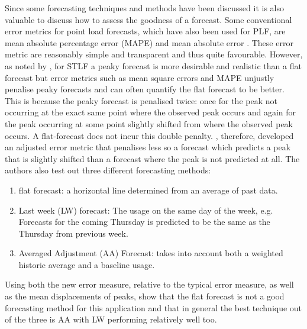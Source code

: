 \documentclass[a4paper]{article}
\begin{document}
Since some forecasting techniques and methods have been discussed it is also valuable to discuss how to assess the goodness of a forecast. Some conventional error metrics for point load forecasts, which have also been used for PLF, are mean absolute percentage error (MAPE) and mean absolute error \citep{hong16}. These error metric are reasonably simple and transparent and thus quite favourable. However, as noted by \cite{dan14}, for STLF a peaky forecast is more desirable and realistic than a flat forecast but error metrics such as mean square errors and MAPE unjustly penalise peaky forecasts and can often quantify the flat forecast to be better. This is because the peaky forecast is penalised twice: once for the peak not occurring at the exact same point where the observed peak occurs and again for the peak occurring at some point slightly shifted from where the observed peak occurs. A flat-forecast does not incur this double penalty. \citet{dan14}, therefore, developed an adjusted error metric that penalises less so a forecast which predicts a peak that is slightly shifted than a forecast where the peak is not predicted at all. The authors also test out three different forecasting methods:
\begin{enumerate}
\item flat forecast: a horizontal line determined from an average of past data.
\item Last week (LW) forecast: The usage on the same day of the week, e.g. Forecasts for the coming Thursday is predicted to be the same as the Thursday from previous week.
\item Averaged Adjustment (AA) Forecast: takes into account both a weighted historic average and a baseline usage.
\end{enumerate}

Using both the new error measure, relative to the typical error measure, as well as the mean displacements of peaks, \cite{dan14} show that the flat forecast is not a good forecasting method for this application and that in general the best technique out of the three is AA with LW performing relatively well too.
\end{document}
